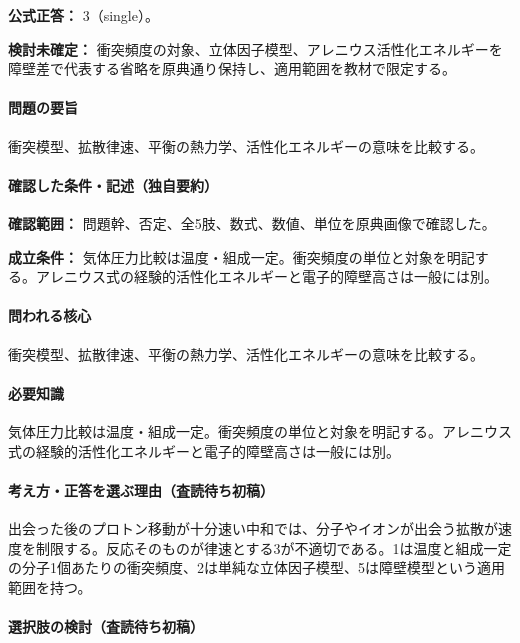 \textbf{公式正答：} 3（single）。

\par\textbf{検討未確定：} 衝突頻度の対象、立体因子模型、アレニウス活性化エネルギーを障壁差で代表する省略を原典通り保持し、適用範囲を教材で限定する。

\paragraph{問題の要旨} 衝突模型、拡散律速、平衡の熱力学、活性化エネルギーの意味を比較する。

\paragraph{確認した条件・記述（独自要約）}\mbox{}\par

\noindent\textbf{確認範囲：} 問題幹、否定、全5肢、数式、数値、単位を原典画像で確認した。\par

\noindent\textbf{成立条件：} 気体圧力比較は温度・組成一定。衝突頻度の単位と対象を明記する。アレニウス式の経験的活性化エネルギーと電子的障壁高さは一般には別。\par

\paragraph{問われる核心} 衝突模型、拡散律速、平衡の熱力学、活性化エネルギーの意味を比較する。

\paragraph{必要知識} 気体圧力比較は温度・組成一定。衝突頻度の単位と対象を明記する。アレニウス式の経験的活性化エネルギーと電子的障壁高さは一般には別。

\paragraph{考え方・正答を選ぶ理由（査読待ち初稿）} 出会った後のプロトン移動が十分速い中和では、分子やイオンが出会う拡散が速度を制限する。反応そのものが律速とする3が不適切である。1は温度と組成一定の分子1個あたりの衝突頻度、2は単純な立体因子模型、5は障壁模型という適用範囲を持つ。

\paragraph{選択肢の検討（査読待ち初稿）}\mbox{}\par

